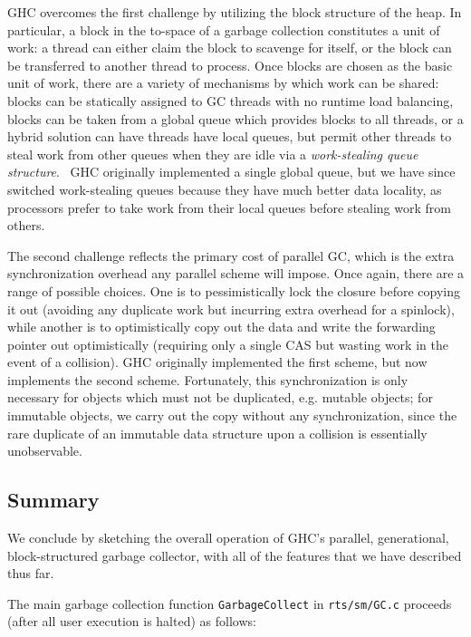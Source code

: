 GHC overcomes the first challenge by utilizing the block structure of
the heap.  In particular, a block in the to-space of a garbage
collection constitutes a unit of work: a thread can either claim the
block to scavenge for itself, or the block can be transferred to another
thread to process.  Once blocks are chosen as the basic unit of
work, there are a variety of mechanisms by which work can be shared:
blocks can be statically assigned to GC threads with no runtime load
balancing, blocks can be taken from a global queue which provides blocks
to all threads, or a hybrid solution can have threads have local queues,
but permit other threads to steal work from other queues when they are
idle via a \emph{work-stealing queue structure}.~\cite{Arora:1998:TSM:277651.277678}  GHC originally
implemented a single global queue, but we have since switched work-stealing queues
because they have much better data locality, as processors prefer to take
work from their local queues before stealing work from others.

The second challenge reflects the primary cost of parallel GC, which is
the extra synchronization overhead any parallel scheme will impose.
Once again, there are a range of possible choices.  One is to
pessimistically lock the closure before copying it out (avoiding any
duplicate work but incurring extra overhead for a spinlock), while
another is to optimistically copy out the data and write the forwarding
pointer out optimistically (requiring only a single CAS but wasting work
in the event of a collision).  GHC originally implemented the first
scheme, but now implements the second scheme.   Fortunately, this synchronization is only necessary for objects
which must not be duplicated, e.g. mutable objects; for immutable
objects, we carry out the copy without any synchronization, since the
rare duplicate of an immutable data structure upon a collision is
essentially unobservable.

\subsection{Summary}

We conclude by sketching the overall operation of GHC's parallel,
generational, block-structured garbage collector, with all of the
features that we have described thus far.

The main garbage collection function
\verb|GarbageCollect| in \verb|rts/sm/GC.c| proceeds (after all user
execution is halted) as follows:

